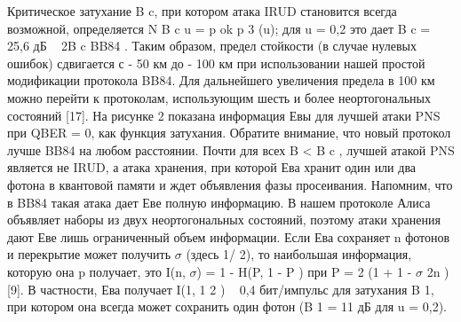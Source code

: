 Критическое затухание B c, при котором атака IRUD становится всегда возможной, определяется N B c u = p ok p 3 (u); для u = 0,2 это дает B c = 25,6 дБ ~ 2B c BB84 . Таким образом, предел стойкости (в случае нулевых ошибок) сдвигается с - 50 км до - 100 км при использовании нашей простой модификации протокола BB84. Для дальнейшего увеличения предела в 100 км можно перейти к протоколам, использующим шесть и более неортогональных состояний [17].
На рисунке 2 показана информация Евы для лучшей атаки PNS при QBER = 0, как функция затухания. Обратите внимание, что новый протокол лучше BB84 на любом расстоянии. Почти для всех B < B c , лучшей атакой PNS является не IRUD, а атака хранения, при которой Ева хранит один или два фотона в квантовой памяти и ждет объявления фазы просеивания. Напомним, что в BB84 такая атака дает Еве полную информацию. В нашем протоколе Алиса объявляет наборы из двух неортогональных состояний, поэтому атаки хранения дают Еве лишь ограниченный объем информации.
Если Ева сохраняет n фотонов и перекрытие может получить $\sigma$ (здесь 1/ 2), то наибольшая информация, которую она p получает, это I(n, $\sigma$) = 1 - H(P, 1 - P ) при P = 2 (1 + 1 - $\sigma$ 2n )[9]. В частности, Ева получает I(1, 1 2 ) ~ 0,4 бит/импульс для затухания B 1, при котором она всегда может сохранить один фотон (B 1 = 11 дБ для u = 0,2).

